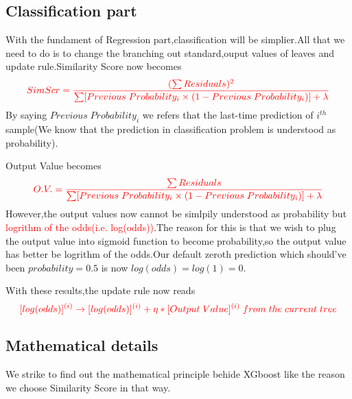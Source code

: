 \documentclass{article}
\begin{document}
\subsection{Classification part}
With the fundament of Regression part,classification will be simplier.All that we need to do is to change the branching out standard,ouput values of leaves and update rule.Similarity Score now becomes$$\textcolor{red}{SimScr=\frac{(\sum Residuals)^2}{\sum[Previous\;Probability_i\times(1-Previous\;Probability_i)]+\lambda}}$$By saying $Previous\;Probability_i$ we refers that the last-time prediction of $i^{th}$ sample(We know that the prediction in classification problem is understood as probability).

Output Value becomes$$\textcolor{red}{O.V.=\frac{\sum Residuals}{\sum[Previous\;Probability_i\times(1-Previous\;Probability_i)]+\lambda}}$$However,the output values now cannot be simlpily understood as probability but \textcolor{red}{logrithm of the odds(i.e. log(odds))}.The reason for this is that we wish to plug the output value into sigmoid function to become probability,so the output value has better be logrithm of the odds.Our default zeroth prediction which should've been $probability=0.5$ is now $log(odds)=log(1)=0$.

With these results,the update rule now reads$$\textcolor{red}{[log(odds)]^{(i)}\rightarrow [log(odds)]^{(i)}+\eta*[Output\;Value]^{(i)}\;from\;the\;current\;tree}$$
\subsection{Mathematical details}
We strike to find out the mathematical principle behide XGboost like the reason we choose Similarity Score in that way.
\end{document}
